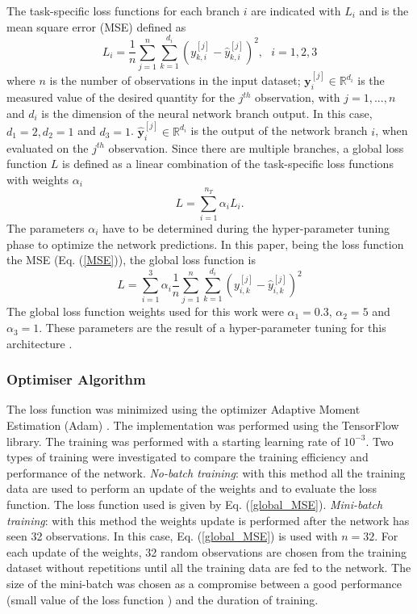 \documentclass[sensors,article,submit,moreauthors,pdftex,10pt,a4paper]{Definitions/mdpi}
\begin{document}
The task-specific loss functions for each branch $i$ are indicated with $L_i$ and is the mean square error (MSE) defined as
\begin{equation}
L_i = \frac{1}{n} \sum_{j=1}^n \sum_{k=1}^{d_i} (y_{k,i}^{[j]}-\hat y_{k,i}^{[j]})^2, \ \ \ i=1,2,3
\label{MSE}
\end{equation}
where $n$ is the number of observations in the input dataset; ${\pmb y}_i^{[j]} \in \mathbb{R}^{d_i}$ is the measured value of the desired quantity for the $j^{th}$ observation, with $j=1, ..., n$  and $d_i$ is the dimension of the neural network branch output. In this case, $d_1=2, d_2=1$ and $d_3=1$. $ \hat {\pmb y}_i^{[j]} \in \mathbb{R}^{d_i}$ is the output of the network branch $i$, when evaluated on the $j^{th}$ observation. Since there are multiple branches, a global loss function $L$ is defined as a linear combination of the task-specific loss functions with weights $\alpha_i$ 
\begin{equation}
L = \sum_{i=1}^{n_T}\alpha_i L_i .
\label{globalcf}
\end{equation}
The parameters $\alpha_i$ have to be determined during the hyper-parameter tuning phase to optimize the network predictions.
In this paper, being the loss function the MSE (Eq. (\ref{MSE})), the global loss function is
\begin{equation}
L = \sum_{i=1}^{3}\alpha_i \frac{1}{n} \sum_{j=1}^n \sum_{k=1}^{d_i} (y_{i,k}^{[j]}-\hat y_{i,k}^{[j]})^2
\label{global_MSE}
\end{equation}
The global loss function weights used for this work were $\alpha_1 = 0.3$, $\alpha_2 = 5$ and $\alpha_3 = 1$. These parameters are the result of a hyper-parameter tuning for this architecture \cite{Michelucci2019_2}.
 

\subsubsection{Optimiser Algorithm}
\label{training}

The loss function was minimized using the optimizer Adaptive Moment Estimation (Adam) \cite{Kingma2014, Michelucci2017}. The implementation was performed using the TensorFlow\texttrademark $\ $library. The training was performed with a starting learning rate of $10^{-3}$. Two types of training were investigated to compare the training efficiency and performance of the network. {\sl No-batch training}: with this method all the training data  are used to perform an update of the weights and to evaluate the loss function. The loss function used is given by Eq. (\ref{global_MSE}). {\sl Mini-batch training}: with this method the weights update is performed after the network has seen 32 observations. In this case, Eq. (\ref{global_MSE}) is used with $n=32$. For each update of the weights, 32 random observations are chosen from the training dataset without repetitions until all the training data are fed to the network. 
The size of the mini-batch was chosen as a compromise between a good performance (small value of the loss function ) and the duration of training.
\end{document}
